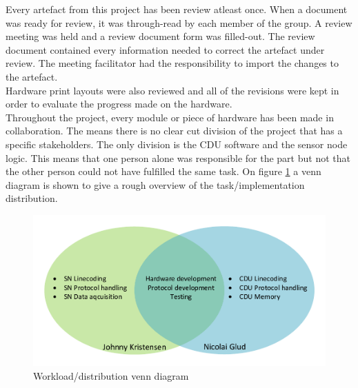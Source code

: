 Every artefact from this project has been review atleast once. When a document was ready for review, it was through-read by each member of the group. A review meeting was held and a review document form was filled-out. The review document contained every information needed to correct the artefact under review. The meeting facilitator had the responsibility to import the changes to the artefact.\\

Hardware print layouts were also reviewed and all of the revisions were kept in order to evaluate the progress made on the hardware.\\
Throughout the project, every module or piece of hardware has been made in collaboration. The means there is no clear cut division of the project that has a specific stakeholders. The only division is the CDU software and the sensor node logic. This means that one person alone was responsible for the part but not that the other person could not have fulfilled the same task. On figure \ref{fig:workvenn} a venn diagram is shown to give a rough overview of the task/implementation distribution.

\begin{figure}[hbpt]
	\centering
	\includegraphics[width=.8\textwidth]{billeder/9projectexecution/workload_venn}
	\caption{Workload/distribution venn diagram}
	\label{fig:workvenn}
\end{figure}

